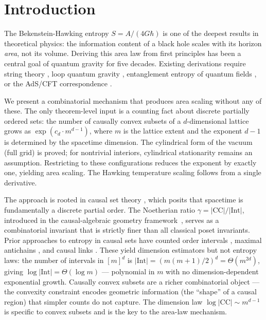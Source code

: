 \documentclass[aps,prl,twocolumn,superscriptaddress]{revtex4-2}
\begin{document}
\maketitle

\section{Introduction}

The Bekenstein-Hawking entropy $S = A/(4G\hbar)$
\cite{Bekenstein1973,Hawking1975} is one of the deepest results in
theoretical physics: the information content of a black hole scales
with its horizon \emph{area}, not its volume. Deriving this area law
from first principles has been a central goal of quantum gravity for
five decades. Existing derivations require string theory
\cite{StromingerVafa1996}, loop quantum gravity \cite{Rovelli1996},
entanglement entropy of quantum fields \cite{Bombelli1986}, or the
AdS/CFT correspondence \cite{Maldacena1999}.

We present a combinatorial mechanism that produces area scaling without any of these. The only theorem-level input is
a counting fact about discrete partially ordered sets: the number
of causally convex subsets of a $d$-dimensional lattice grows as
$\exp(c_d \cdot m^{d-1})$, where $m$ is the lattice extent and the
exponent $d-1$ is determined by the spacetime dimension.
The cylindrical form of the vacuum (full grid) is proved; for
nontrivial interiors, cylindrical stationarity remains an assumption. Restricting
to these configurations reduces the exponent by exactly one,
yielding area scaling. The Hawking temperature scaling follows from a single
derivative.

The approach is rooted in causal set theory
\cite{Bombelli1987,Surya2019}, which posits that spacetime is
fundamentally a discrete partial order. The Noetherian ratio
$\gamma = |\mathrm{CC}|/|\mathrm{Int}|$, introduced in the
causal-algebraic geometry framework~\cite{DiFiorePaper1}, serves as a
combinatorial invariant that is strictly finer than all classical poset
invariants. Prior approaches to entropy in
causal sets have counted order intervals \cite{RideoutSorkin}, maximal
antichains \cite{BrightwellGregory}, and causal links
\cite{Myrheim,Meyer}. These yield dimension estimators but not entropy
laws: the number of intervals in $[m]^d$ is
$|\mathrm{Int}| = (m(m{+}1)/2)^d = \Theta(m^{2d})$, giving
$\log|\mathrm{Int}| = \Theta(\log m)$ --- polynomial in $m$ with no
dimension-dependent exponential growth. Causally convex subsets are a
richer combinatorial object --- the convexity constraint encodes
geometric information (the ``shape'' of a causal region) that simpler
counts do not capture. The dimension law
$\log|\mathrm{CC}| \sim m^{d-1}$ is specific to convex subsets and is
the key to the area-law mechanism.
\end{document}
